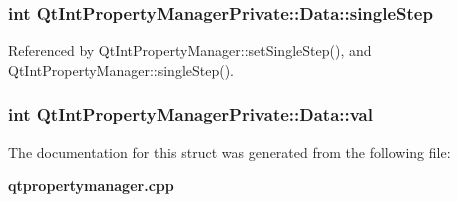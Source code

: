 \subsubsection[{single\+Step}]{\setlength{\rightskip}{0pt plus 5cm}int Qt\+Int\+Property\+Manager\+Private\+::\+Data\+::single\+Step}\label{structQtIntPropertyManagerPrivate_1_1Data_afefb311db69562f6a82c194e87ab1ddb}


Referenced by Qt\+Int\+Property\+Manager\+::set\+Single\+Step(), and Qt\+Int\+Property\+Manager\+::single\+Step().

\subsubsection[{val}]{\setlength{\rightskip}{0pt plus 5cm}int Qt\+Int\+Property\+Manager\+Private\+::\+Data\+::val}\label{structQtIntPropertyManagerPrivate_1_1Data_aa07bd9b8022a98b56cdf5846a0141261}


The documentation for this struct was generated from the following file\+:\begin{DoxyCompactItemize}
\item 
{\bf qtpropertymanager.\+cpp}\end{DoxyCompactItemize}
